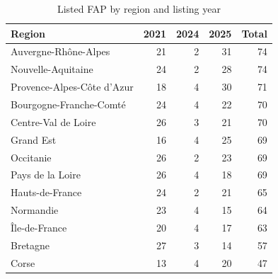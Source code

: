 \begin{table}[ht]
\centering
\begin{tabular}{lrrrr}
  \toprule
Region & 2021 & 2024 & 2025 & Total \\ 
  \midrule
Auvergne-Rhône-Alpes &  21 &   2 &  31 &  74 \\ 
  Nouvelle-Aquitaine &  24 &   2 &  28 &  74 \\ 
  Provence-Alpes-Côte d'Azur &  18 &   4 &  30 &  71 \\
  Bourgogne-Franche-Comté &  24 &   4 &  22 &  70 \\
  Centre-Val de Loire &  26 &   3 &  21 &  70 \\ 
  Grand Est &  16 &   4 &  25 &  69 \\ 
  Occitanie &  26 &   2 &  23 &  69 \\ 
  Pays de la Loire &  26 &   4 &  18 &  69 \\ 
  Hauts-de-France &  24 &   2 &  21 &  65 \\ 
  Normandie &  23 &   4 &  15 &  64 \\ 
  Île-de-France &  20 &   4 &  17 &  63 \\
  Bretagne &  27 &   3 &  14 &  57 \\ 
  Corse &  13 &   4 &  20 &  47 \\ 
   \bottomrule
\end{tabular}
\caption{Listed FAP by region and listing year} 
\end{table}
